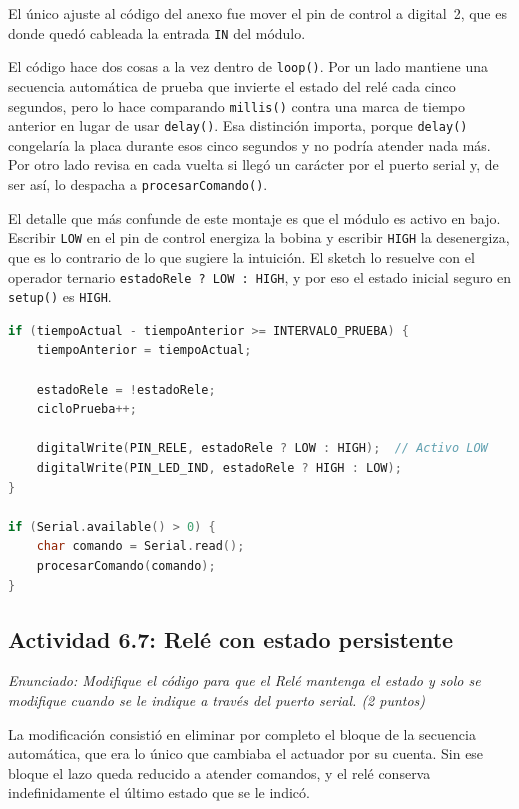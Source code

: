 El único ajuste al código del anexo fue mover el pin de control a digital~2, que es donde
quedó cableada la entrada \texttt{IN} del módulo.

El código hace dos cosas a la vez dentro de \texttt{loop()}. Por un lado mantiene una
secuencia automática de prueba que invierte el estado del relé cada cinco segundos, pero
lo hace comparando \texttt{millis()} contra una marca de tiempo anterior en lugar de usar
\texttt{delay()}. Esa distinción importa, porque \texttt{delay()} congelaría la placa
durante esos cinco segundos y no podría atender nada más. Por otro lado revisa en cada
vuelta si llegó un carácter por el puerto serial y, de ser así, lo despacha a
\texttt{procesarComando()}.

El detalle que más confunde de este montaje es que el módulo es activo en bajo. Escribir
\texttt{LOW} en el pin de control energiza la bobina y escribir \texttt{HIGH} la
desenergiza, que es lo contrario de lo que sugiere la intuición. El sketch lo resuelve con
el operador ternario \texttt{estadoRele ? LOW : HIGH}, y por eso el estado inicial seguro
en \texttt{setup()} es \texttt{HIGH}.

\begin{lstlisting}[language=C++,
    caption={Conmutación del relé y atención de comandos en \texttt{loop()}.},
    label={lst:rele_loop},
    float=ht!]
if (tiempoActual - tiempoAnterior >= INTERVALO_PRUEBA) {
    tiempoAnterior = tiempoActual;

    estadoRele = !estadoRele;
    cicloPrueba++;

    digitalWrite(PIN_RELE, estadoRele ? LOW : HIGH);  // Activo LOW
    digitalWrite(PIN_LED_IND, estadoRele ? HIGH : LOW);
}

if (Serial.available() > 0) {
    char comando = Serial.read();
    procesarComando(comando);
}
\end{lstlisting}

\clearpage
\subsection{Actividad 6.7: Relé con estado persistente}
\textit{Enunciado: Modifique el código para que el Relé mantenga el estado y solo se
modifique cuando se le indique a través del puerto serial. (2 puntos)}

La modificación consistió en eliminar por completo el bloque de la secuencia automática,
que era lo único que cambiaba el actuador por su cuenta. Sin ese bloque el lazo queda
reducido a atender comandos, y el relé conserva indefinidamente el último estado que se
le indicó.

